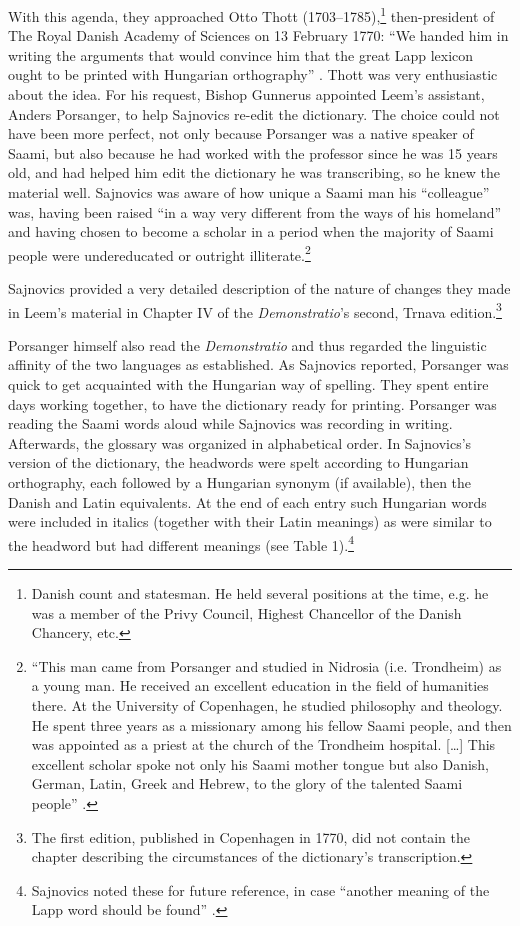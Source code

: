 \documentclass[output=paper,colorlinks,citecolor=brown,arabicfont,chinesefont]{langscibook}
\begin{document}
With this agenda, they approached Otto Thott (1703--1785),\footnote{Danish count and statesman. He held several positions at the time, e.g. he was a member of the Privy Council, Highest Chancellor of the Danish Chancery, etc.} then-president of The Royal Danish Academy of Sciences on 13 February 1770: “We handed him in writing the arguments that would convince him that the great Lapp lexicon ought to be printed with Hungarian orthography” \citep[135]{Sajnovics1990}. Thott was very enthusiastic about the idea. For his request, Bishop Gunnerus appointed Leem’s assistant, Anders Porsanger, to help Sajnovics re-edit the dictionary. The choice could not have been more perfect, not only because Porsanger was a native speaker of Saami, but also because he had worked with the professor since he was 15 years old, and had helped him edit the dictionary he was transcribing, so he knew the material well. Sajnovics was aware of how unique a Saami man his “colleague” was, having been raised “in a way very different from the ways of his homeland” and having chosen to become a scholar in a period when the majority of Saami people were undereducated or outright illiterate.\footnote{“This man came from Porsanger and studied in Nidrosia (i.e. Trondheim) as a young man. He received an excellent education in the field of humanities there. At the University of Copenhagen, he studied philosophy and theology. He spent three years as a missionary among his fellow Saami people, and then was appointed as a priest at the church of the Trondheim hospital. […] This excellent scholar spoke not only his Saami mother tongue but also Danish, German, Latin, Greek and Hebrew, to the glory of the talented Saami people” \citep[43]{Sajnovics1994}.}

Sajnovics provided a very detailed description of the nature of changes they made in Leem’s material in Chapter IV of the \textit{Demonstratio}’s second, Trnava edition.\footnote{The first edition, published in Copenhagen in 1770, did not contain the chapter describing the circumstances of the dictionary’s transcription.}

Porsanger himself also read the \textit{Demonstratio} and thus regarded the linguistic affinity of the two languages as established. As Sajnovics reported, Porsanger was quick to get acquainted with the Hungarian way of spelling. They spent entire days working together, to have the dictionary ready for printing. Porsanger was reading the Saami words aloud while Sajnovics was recording in writing. Afterwards, the glossary was organized in alphabetical order. In Sajnovics’s version of the dictionary, the headwords were spelt according to Hungarian orthography, each followed by a Hungarian synonym (if available), then the Danish and Latin equivalents. At the end of each entry such Hungarian words were included in italics (together with their Latin meanings) as were similar to the headword but had different meanings (see Table 1).\footnote{Sajnovics noted these for future reference, in case “another meaning of the Lapp word should be found” \citep[44]{Sajnovics1994}.}
\end{document}

